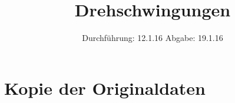 

\subject{V 102}
\title{Drehschwingungen}
\date{
  Durchführung: 12.1.16
  \hspace{3em}
  Abgabe: 19.1.16
}



\maketitle
\thispagestyle{empty}
\tableofcontents
\newpage






\printbibliography

\appendix
\section{Kopie der Originaldaten}


